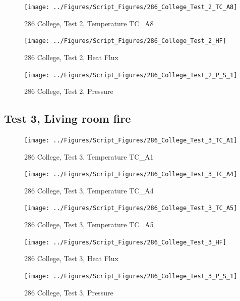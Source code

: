 \documentclass[12pt,oneside]{book}
\begin{document}
\begin{figure}[!ht]
\texttt{[image: ../Figures/Script\_Figures/286\_College\_Test\_2\_TC\_A8]}
\caption{286 College, Test 2, Temperature TC\_A8}
\label{fig:286_College_Test_2_TC_A8}
\end{figure}

\begin{figure}[!ht]
\texttt{[image: ../Figures/Script\_Figures/286\_College\_Test\_2\_HF]}
\caption{286 College, Test 2, Heat Flux}
\label{fig:286_College_Test_2_HF}
\end{figure}

\begin{figure}[!ht]
\texttt{[image: ../Figures/Script\_Figures/286\_College\_Test\_2\_P\_S\_1]}
\caption{286 College, Test 2, Pressure}
\label{fig:286_College_Test_2_P_S_1}
\end{figure}


\clearpage


\subsection{Test 3, Living room fire}

\begin{figure}[!ht]
\texttt{[image: ../Figures/Script\_Figures/286\_College\_Test\_3\_TC\_A1]}
\caption{286 College, Test 3, Temperature TC\_A1}
\label{fig:286_College_Test_3_TC_A1}
\end{figure}

\begin{figure}[!ht]
\texttt{[image: ../Figures/Script\_Figures/286\_College\_Test\_3\_TC\_A4]}
\caption{286 College, Test 3, Temperature TC\_A4}
\label{fig:286_College_Test_3_TC_A4}
\end{figure}

\begin{figure}[!ht]
\texttt{[image: ../Figures/Script\_Figures/286\_College\_Test\_3\_TC\_A5]}
\caption{286 College, Test 3, Temperature TC\_A5}
\label{fig:286_College_Test_3_TC_A5}
\end{figure}

\begin{figure}[!ht]
\texttt{[image: ../Figures/Script\_Figures/286\_College\_Test\_3\_HF]}
\caption{286 College, Test 3, Heat Flux}
\label{fig:286_College_Test_3_HF}
\end{figure}

\begin{figure}[!ht]
\texttt{[image: ../Figures/Script\_Figures/286\_College\_Test\_3\_P\_S\_1]}
\caption{286 College, Test 3, Pressure}
\label{fig:286_College_Test_3_P_S_1}
\end{figure}
\end{document}
